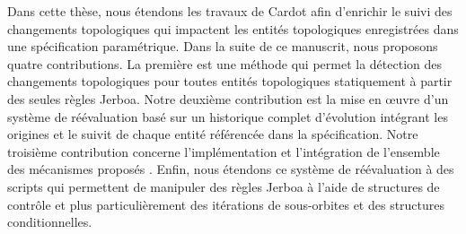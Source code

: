 Dans cette thèse, nous étendons les travaux de Cardot afin d'enrichir le suivi des changements topologiques qui impactent les entités topologiques
enregistrées dans une spécification paramétrique. %
Dans la suite de ce manuscrit, nous proposons quatre
contributions. %
La première est une méthode qui permet la détection des changements
topologiques pour toutes entités topologiques statiquement à partir des seules
règles Jerboa. %
Notre deuxième contribution est la mise en \oe uvre d'un système de réévaluation basé sur un historique complet d'évolution intégrant les origines et le suivit de chaque entité référencée dans la spécification. Notre troisième contribution concerne l'implémentation et l'intégration  de l'ensemble des mécanismes proposés .  %
Enfin, nous étendons ce système de réévaluation à des scripts qui permettent de manipuler
 des règles Jerboa à l'aide de structures de contrôle et plus
particulièrement des itérations de sous-orbites et des structures
conditionnelles. %


